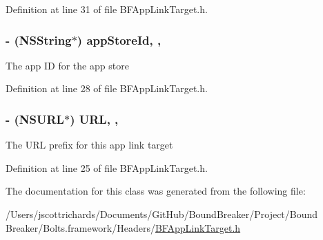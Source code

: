 Definition at line 31 of file B\+F\+App\+Link\+Target.\+h.

\hypertarget{interface_b_f_app_link_target_ac7750ffc69198f8bf2ddbed9046eca60}{}
\subsubsection[{app\+Store\+Id}]{\setlength{\rightskip}{0pt plus 5cm}-\/ (N\+S\+String$\ast$) app\+Store\+Id\hspace{0.3cm}{\ttfamily [read]}, {\ttfamily [nonatomic]}, {\ttfamily [copy]}}\label{interface_b_f_app_link_target_ac7750ffc69198f8bf2ddbed9046eca60}
The app I\+D for the app store 

Definition at line 28 of file B\+F\+App\+Link\+Target.\+h.

\hypertarget{interface_b_f_app_link_target_a709dbbdd1a196272352283877f45783e}{}
\subsubsection[{U\+R\+L}]{\setlength{\rightskip}{0pt plus 5cm}-\/ (N\+S\+U\+R\+L$\ast$) U\+R\+L\hspace{0.3cm}{\ttfamily [read]}, {\ttfamily [nonatomic]}, {\ttfamily [strong]}}\label{interface_b_f_app_link_target_a709dbbdd1a196272352283877f45783e}
The U\+R\+L prefix for this app link target 

Definition at line 25 of file B\+F\+App\+Link\+Target.\+h.



The documentation for this class was generated from the following file\+:\begin{DoxyCompactItemize}
\item 
/\+Users/jscottrichards/\+Documents/\+Git\+Hub/\+Bound\+Breaker/\+Project/\+Bound Breaker/\+Bolts.\+framework/\+Headers/\hyperlink{_b_f_app_link_target_8h}{B\+F\+App\+Link\+Target.\+h}\end{DoxyCompactItemize}
